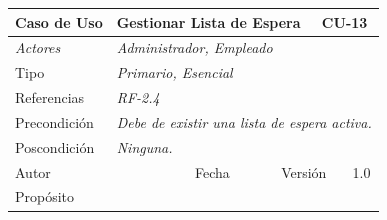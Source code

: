 \begin{table}[H]
    \begin{tabular}{|llllllll|}
    \hline
    \multicolumn{1}{|l|}{\cellcolor[HTML]{F2F2F2}Caso de Uso}           & \multicolumn{5}{l|}{Gestionar Lista de Espera}                                                                       & \multicolumn{2}{l|}{\cellcolor[HTML]{E6E6E6}CU-13}             \\ \hline
    \multicolumn{1}{|l|}{{\color[HTML]{808080} \textit{Actores}}}       & \multicolumn{7}{l|}{{\color[HTML]{808080} \textit{Administrador, Empleado}}}                                                                                                      \\ \hline
    \multicolumn{1}{|l|}{Tipo}                                          & \multicolumn{7}{l|}{{\color[HTML]{808080} \textit{Primario, Esencial}}}                                                                                                                           \\ \hline
    \multicolumn{1}{|l|}{Referencias}                                   & \multicolumn{2}{l|}{{\color[HTML]{808080} \textit{RF-2.4}}}                & \multicolumn{5}{l|}{}                                                                                                \\ \hline
    \multicolumn{1}{|l|}{Precondici\'on}                                  & \multicolumn{7}{l|}{{\color[HTML]{808080} \textit{Debe de existir una lista de espera activa.}}}                                                                                                      \\ \hline
    \multicolumn{1}{|l|}{Poscondici\'on}                                  & \multicolumn{7}{l|}{{\color[HTML]{808080} \textit{Ninguna.}}}                                                                                                                                                                             \\ \hline
    \multicolumn{1}{|l|}{Autor}                                         & \multicolumn{1}{l|}{}                         & \multicolumn{2}{l|}{Fecha}             & \multicolumn{1}{l|}{}        & \multicolumn{2}{l|}{Versi\'on}             & 1.0                            \\ \hline
    \multicolumn{8}{|l|}{Prop\'osito}                                                                                                                                                                                                                                         \\ \hline

\end{tabular}
\end{table}
